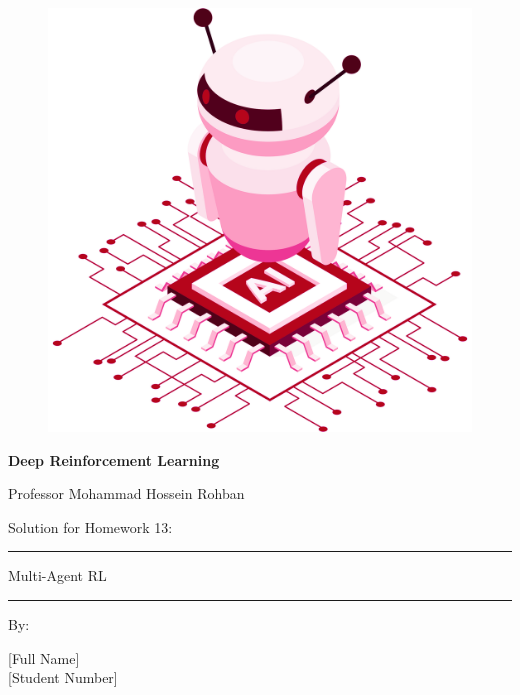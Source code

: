 \documentclass[12pt]{article}
\begin{document}
\thispagestyle{plain}

\begin{center}

\vspace*{-1.5cm}
\begin{figure}[!h]
    \centering
    \includegraphics[width=0.7\linewidth]{figs/cover-std.png}
\end{figure}

{

{\color{DarkBlue} {\fontsize{30}{50} \textbf{
Deep Reinforcement Learning
}}}

{\color{DarkBlue} {\Large
Professor Mohammad Hossein Rohban
}}
}


\vspace{20pt}

{

{\color{RedOrange}
{\Large
Solution for Homework 13:
}\\
}
{\color{BrickRed}
\rule{12cm}{0.5pt}

{\Huge
Multi-Agent RL

}
\rule{12cm}{0.5pt}
}

\vspace{10pt}

{\color{RoyalPurple} { \small By:} } \\
\vspace{10pt}

{\color{Blue} { \LARGE [Full Name] } } \\
\vspace{5pt}
{\color{RoyalBlue} { \Large [Student Number] } }


}
\end{center}
\end{document}
